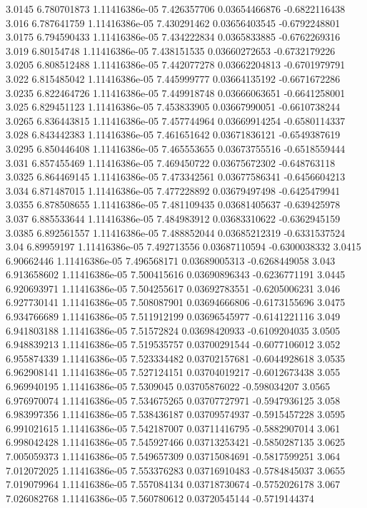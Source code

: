 {3.0145 6.780701873 1.11416386e-05 7.426357706 0.03654466876 -0.6822116438
3.016 6.787641759 1.11416386e-05 7.430291462 0.03656403545 -0.6792248801
3.0175 6.794590433 1.11416386e-05 7.434222834 0.0365833885 -0.6762269316
3.019 6.80154748 1.11416386e-05 7.438151535 0.03660272653 -0.6732179226
3.0205 6.808512488 1.11416386e-05 7.442077278 0.03662204813 -0.6701979791
3.022 6.815485042 1.11416386e-05 7.445999777 0.03664135192 -0.6671672286
3.0235 6.822464726 1.11416386e-05 7.449918748 0.03666063651 -0.6641258001
3.025 6.829451123 1.11416386e-05 7.453833905 0.03667990051 -0.6610738244
3.0265 6.836443815 1.11416386e-05 7.457744964 0.03669914254 -0.6580114337
3.028 6.843442383 1.11416386e-05 7.461651642 0.03671836121 -0.6549387619
3.0295 6.850446408 1.11416386e-05 7.465553655 0.03673755516 -0.6518559444
3.031 6.857455469 1.11416386e-05 7.469450722 0.03675672302 -0.648763118
3.0325 6.864469145 1.11416386e-05 7.473342561 0.03677586341 -0.6456604213
3.034 6.871487015 1.11416386e-05 7.477228892 0.03679497498 -0.6425479941
3.0355 6.878508655 1.11416386e-05 7.481109435 0.03681405637 -0.639425978
3.037 6.885533644 1.11416386e-05 7.484983912 0.03683310622 -0.6362945159
3.0385 6.892561557 1.11416386e-05 7.488852044 0.03685212319 -0.6331537524
3.04 6.89959197 1.11416386e-05 7.492713556 0.03687110594 -0.6300038332
3.0415 6.90662446 1.11416386e-05 7.496568171 0.03689005313 -0.6268449058
3.043 6.913658602 1.11416386e-05 7.500415616 0.03690896343 -0.6236771191
3.0445 6.920693971 1.11416386e-05 7.504255617 0.03692783551 -0.6205006231
3.046 6.927730141 1.11416386e-05 7.508087901 0.03694666806 -0.6173155696
3.0475 6.934766689 1.11416386e-05 7.511912199 0.03696545977 -0.6141221116
3.049 6.941803188 1.11416386e-05 7.51572824 0.03698420933 -0.6109204035
3.0505 6.948839213 1.11416386e-05 7.519535757 0.03700291544 -0.6077106012
3.052 6.955874339 1.11416386e-05 7.523334482 0.03702157681 -0.6044928618
3.0535 6.962908141 1.11416386e-05 7.527124151 0.03704019217 -0.6012673438
3.055 6.969940195 1.11416386e-05 7.5309045 0.03705876022 -0.598034207
3.0565 6.976970074 1.11416386e-05 7.534675265 0.03707727971 -0.5947936125
3.058 6.983997356 1.11416386e-05 7.538436187 0.03709574937 -0.5915457228
3.0595 6.991021615 1.11416386e-05 7.542187007 0.03711416795 -0.5882907014
3.061 6.998042428 1.11416386e-05 7.545927466 0.03713253421 -0.5850287135
3.0625 7.005059373 1.11416386e-05 7.549657309 0.03715084691 -0.5817599251
3.064 7.012072025 1.11416386e-05 7.553376283 0.03716910483 -0.5784845037
3.0655 7.019079964 1.11416386e-05 7.557084134 0.03718730674 -0.5752026178
3.067 7.026082768 1.11416386e-05 7.560780612 0.03720545144 -0.5719144374
}
